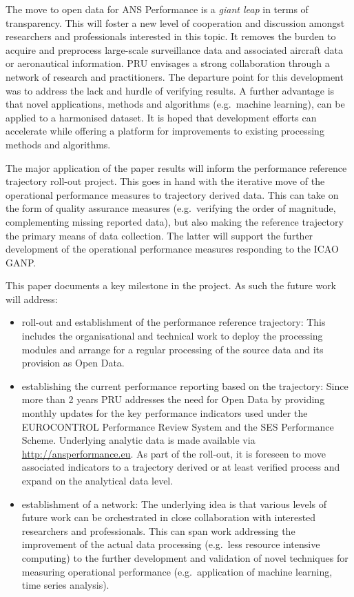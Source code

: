 \documentclass[conference,final,a4paper,]{IEEEtran}
\providecommand{\tightlist}{%
  \setlength{\itemsep}{0pt}\setlength{\parskip}{0pt}}
\begin{document}
The move to open data for ANS Performance is a \emph{giant leap} in
terms of transparency. This will foster a new level of cooperation and
discussion amongst researchers and professionals interested in this
topic. It removes the burden to acquire and preprocess large-scale
surveillance data and associated aircraft data or aeronautical
information. PRU envisages a strong collaboration through a network of
research and practitioners. The departure point for this development was
to address the lack and hurdle of verifying results. A further advantage
is that novel applications, methods and algorithms (e.g.~machine
learning), can be applied to a harmonised dataset. It is hoped that
development efforts can accelerate while offering a platform for
improvements to existing processing methods and algorithms.

The major application of the paper results will inform the performance
reference trajectory roll-out project. This goes in hand with the
iterative move of the operational performance measures to trajectory
derived data. This can take on the form of quality assurance measures
(e.g.~verifying the order of magnitude, complementing missing reported
data), but also making the reference trajectory the primary means of
data collection. The latter will support the further development of the
operational performance measures responding to the ICAO GANP.

This paper documents a key milestone in the project. As such the future
work will address:

\begin{itemize}
\tightlist
\item
  roll-out and establishment of the performance reference trajectory:
  This includes the organisational and technical work to deploy the
  processing modules and arrange for a regular processing of the source
  data and its provision as Open Data.
\item
  establishing the current performance reporting based on the
  trajectory: Since more than 2 years PRU addresses the need for Open
  Data by providing monthly updates for the key performance indicators
  used under the EUROCONTROL Performance Review System and the SES
  Performance Scheme. Underlying analytic data is made available via
  \url{http://ansperformance.eu}. As part of the roll-out, it is
  foreseen to move associated indicators to a trajectory derived or at
  least verified process and expand on the analytical data level.
\item
  establishment of a network: The underlying idea is that various levels
  of future work can be orchestrated in close collaboration with
  interested researchers and professionals. This can span work
  addressing the improvement of the actual data processing (e.g.~less
  resource intensive computing) to the further development and
  validation of novel techniques for measuring operational performance
  (e.g.~application of machine learning, time series analysis).
\end{itemize}
\end{document}
